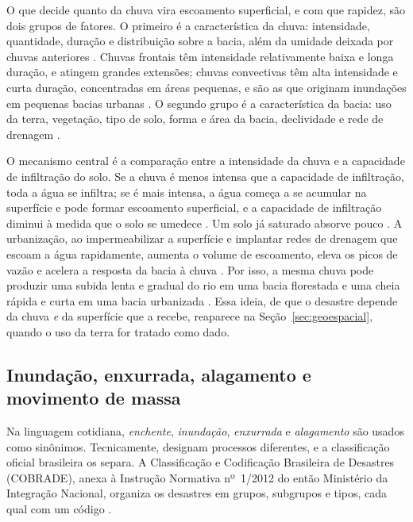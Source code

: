 O que decide quanto da chuva vira escoamento superficial, e com que rapidez, são dois grupos de fatores. O primeiro é a característica da chuva: intensidade, quantidade, duração e distribuição sobre a bacia, além da umidade deixada por chuvas anteriores \cite{usgs_runoff}. Chuvas frontais têm intensidade relativamente baixa e longa duração, e atingem grandes extensões; chuvas convectivas têm alta intensidade e curta duração, concentradas em áreas pequenas, e são as que originam inundações em pequenas bacias urbanas \cite{collischonn2013}. O segundo grupo é a característica da bacia: uso da terra, vegetação, tipo de solo, forma e área da bacia, declividade e rede de drenagem \cite{usgs_runoff}.

O mecanismo central é a comparação entre a intensidade da chuva e a capacidade de infiltração do solo. Se a chuva é menos intensa que a capacidade de infiltração, toda a água se infiltra; se é mais intensa, a água começa a se acumular na superfície e pode formar escoamento superficial, e a capacidade de infiltração diminui à medida que o solo se umedece \cite{collischonn2013}. Um solo já saturado absorve pouco \cite{usgs_infiltration}. A urbanização, ao impermeabilizar a superfície e implantar redes de drenagem que escoam a água rapidamente, aumenta o volume de escoamento, eleva os picos de vazão e acelera a resposta da bacia à chuva \cite{collischonn2013}. Por isso, a mesma chuva pode produzir uma subida lenta e gradual do rio em uma bacia florestada e uma cheia rápida e curta em uma bacia urbanizada \cite{usgs_runoff}. Essa ideia, de que o desastre depende da chuva \emph{e} da superfície que a recebe, reaparece na Seção~\ref{sec:geoespacial}, quando o uso da terra for tratado como dado.

\subsection{Inundação, enxurrada, alagamento e movimento de massa}
\label{subsec:tipologia}

Na linguagem cotidiana, \emph{enchente}, \emph{inundação}, \emph{enxurrada} e \emph{alagamento} são usados como sinônimos. Tecnicamente, designam processos diferentes, e a classificação oficial brasileira os separa. A Classificação e Codificação Brasileira de Desastres (COBRADE), anexa à Instrução Normativa nº~1/2012 do então Ministério da Integração Nacional, organiza os desastres em grupos, subgrupos e tipos, cada qual com um código \cite{brasil2012cobrade}. 

